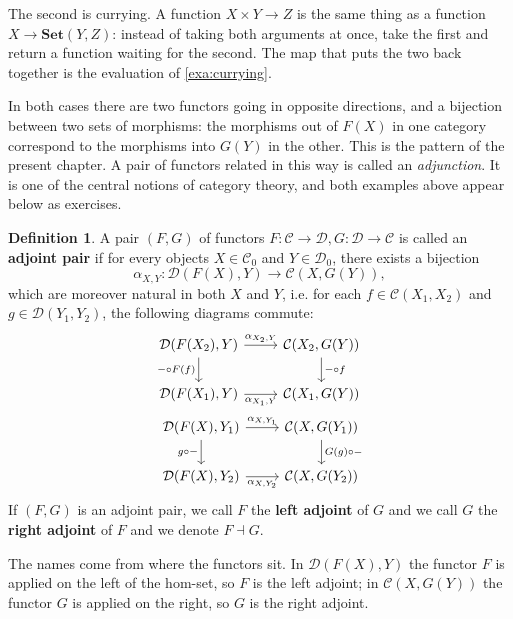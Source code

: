 \documentclass[a4paper,11pt, oneside,titlepage=false]{scrbook}
\theoremstyle{plain}
\theoremstyle{definition}
\newtheorem{dfn}[thm]{Definition}
\newcommand{\Cat}[1]{\mathcal{#1}}
\newcommand{\CC}{\Cat{C}}
\newcommand{\DD}{\Cat{D}}
\newcommand{\Catb}[1]{\mathbf{#1}}
\newcommand{\SET}{\Catb{Set}}
\newcommand{\Ob}[1]{{#1}_0}
\newcommand{\CHom}[3]{{#1}(#2,#3)}
\newcommand{\co}[2]{\ensuremath{#2 \circ #1}}
\begin{document}
The second is currying.
A function $X \times Y \to Z$ is the same thing as a function
$X \to \CHom{\SET}{Y}{Z}$: instead of taking both arguments at once, take the
first and return a function waiting for the second.
The map that puts the two back together is the evaluation of
\cref{exa:currying}.

In both cases there are two functors going in opposite directions, and a
bijection between two sets of morphisms: the morphisms out of $F(X)$ in one
category correspond to the morphisms into $G(Y)$ in the other.
This is the pattern of the present chapter.
A pair of functors related in this way is called an \emph{adjunction}.
It is one of the central notions of category theory, and both examples above
appear below as exercises.

\begin{dfn} A pair $(F,G)$ of functors $F : \CC\to\DD, G:\DD\to\CC$ is called an \textbf{adjoint pair} if for every objects $X\in\Ob{\CC}$ and $Y\in\Ob{\DD}$, there exists a bijection
\[
\alpha_{X,Y} : \CHom{\DD}{F(X)}{Y} \to \CHom{\CC}{X}{G(Y)},
\]
which are moreover natural in both $X$ and $Y$, i.e. for each $f\in\CHom{\CC}{X_1}{X_2}$ and $g\in\CHom{\DD}{Y_1}{Y_2}$, the following diagrams commute:
\begin{eqnarray*}
\begin{tikzcd}
\CHom{\DD}{F(X_2)}{Y} \arrow[r, "\alpha_{X_2,Y}"] \arrow[d,swap, "\co{F(f)}{-}"] & \CHom{\CC}{X_2}{G(Y)} \arrow[d, "\co{f}{-}"] \\
\CHom{\DD}{F(X_1)}{Y} \arrow[r,swap, "\alpha_{X_1,Y}"] & \CHom{\CC}{X_1}{G(Y)}
\end{tikzcd}\\
\begin{tikzcd}
\CHom{\DD}{F(X)}{Y_1} \arrow[r, "\alpha_{X,Y_1}"] \arrow[d,swap, "\co{-}{g}"] & \CHom{\CC}{X}{G(Y_1)} \arrow[d, "\co{-}{G(g)}"] \\
\CHom{\DD}{F(X)}{Y_2} \arrow[r,swap, "\alpha_{X,Y_2}"] & \CHom{\CC}{X}{G(Y_2)}
\end{tikzcd}
\end{eqnarray*}
If $(F,G)$ is an adjoint pair, we call $F$ the \textbf{left adjoint} of $G$ and we call $G$ the \textbf{right adjoint} of $F$ and we denote $F \dashv G$.
\end{dfn}

The names come from where the functors sit.
In $\CHom{\DD}{F(X)}{Y}$ the functor $F$ is applied on the left of the hom-set,
so $F$ is the left adjoint; in $\CHom{\CC}{X}{G(Y)}$ the functor $G$ is applied
on the right, so $G$ is the right adjoint.
\end{document}
